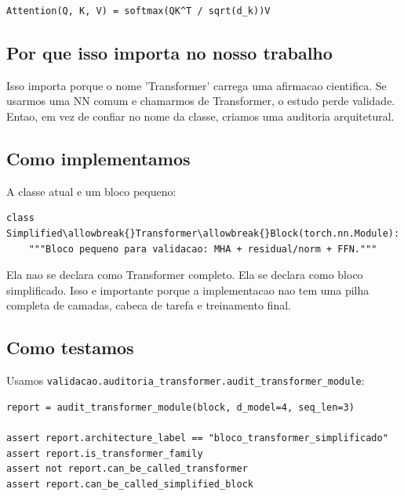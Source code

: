\begin{Verbatim}[fontsize=\small,breaklines=true,label=text]
Attention(Q, K, V) = softmax(QK^T / sqrt(d_k))V
\end{Verbatim}



\subsection{Por que isso importa no nosso trabalho}





Isso importa porque o nome 'Transformer' carrega uma afirmacao cientifica. Se usarmos uma NN comum e chamarmos de Transformer, o estudo perde validade. Entao, em vez de confiar no nome da classe, criamos uma auditoria arquitetural.



\subsection{Como implementamos}



A classe atual e um bloco pequeno:



\begin{Verbatim}[fontsize=\small,breaklines=true,label=python]
class Simplified\allowbreak{}Transformer\allowbreak{}Block(torch.nn.Module):
    """Bloco pequeno para validacao: MHA + residual/norm + FFN."""
\end{Verbatim}





Ela nao se declara como Transformer completo. Ela se declara como bloco simplificado. Isso e importante porque a implementacao nao tem uma pilha completa de camadas, cabeca de tarefa e treinamento final.



\subsection{Como testamos}



Usamos \texttt{validacao.\allowbreak{}auditoria\_\allowbreak{}transformer.\allowbreak{}audit\_\allowbreak{}transformer\_\allowbreak{}module}:



\begin{Verbatim}[fontsize=\small,breaklines=true,label=python]
report = audit_transformer_module(block, d_model=4, seq_len=3)

assert report.architecture_label == "bloco_transformer_simplificado"
assert report.is_transformer_family
assert not report.can_be_called_transformer
assert report.can_be_called_simplified_block
\end{Verbatim}



